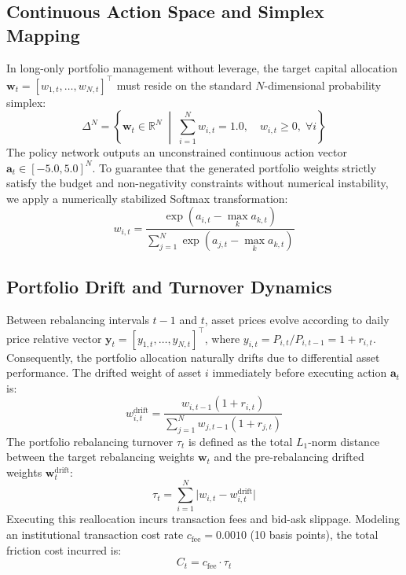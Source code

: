 \documentclass[conference]{IEEEtran}
\begin{document}
\subsection{Continuous Action Space and Simplex Mapping}
In long-only portfolio management without leverage, the target capital allocation $\mathbf{w}_t = [w_{1,t}, \dots, w_{N,t}]^\top$ must reside on the standard $N$-dimensional probability simplex:
\begin{equation}
    \Delta^N = \left\{ \mathbf{w}_t \in \mathbb{R}^N \; \middle| \; \sum_{i=1}^N w_{i,t} = 1.0, \quad w_{i,t} \ge 0, \; \forall i \right\}
\end{equation}
The policy network outputs an unconstrained continuous action vector $\mathbf{a}_t \in [-5.0, 5.0]^N$. To guarantee that the generated portfolio weights strictly satisfy the budget and non-negativity constraints without numerical instability, we apply a numerically stabilized Softmax transformation:
\begin{equation}
    w_{i,t} = \frac{\exp(a_{i,t} - \max_k a_{k,t})}{\sum_{j=1}^N \exp(a_{j,t} - \max_k a_{k,t})}
\end{equation}

\subsection{Portfolio Drift and Turnover Dynamics}
Between rebalancing intervals $t-1$ and $t$, asset prices evolve according to daily price relative vector $\mathbf{y}_t = [y_{1,t}, \dots, y_{N,t}]^\top$, where $y_{i,t} = P_{i,t} / P_{i,t-1} = 1 + r_{i,t}$. Consequently, the portfolio allocation naturally drifts due to differential asset performance. The drifted weight of asset $i$ immediately before executing action $\mathbf{a}_t$ is:
\begin{equation}
    w_{i,t}^{\text{drift}} = \frac{w_{i,t-1} (1 + r_{i,t})}{\sum_{j=1}^N w_{j,t-1} (1 + r_{j,t})}
\end{equation}
The portfolio rebalancing turnover $\tau_t$ is defined as the total $L_1$-norm distance between the target rebalancing weights $\mathbf{w}_t$ and the pre-rebalancing drifted weights $\mathbf{w}_t^{\text{drift}}$:
\begin{equation}
    \tau_t = \sum_{i=1}^N \big| w_{i,t} - w_{i,t}^{\text{drift}} \big|
\end{equation}
Executing this reallocation incurs transaction fees and bid-ask slippage. Modeling an institutional transaction cost rate $c_{\text{fee}} = 0.0010$ (10 basis points), the total friction cost incurred is:
\begin{equation}
    C_t = c_{\text{fee}} \cdot \tau_t
\end{equation}
\end{document}
